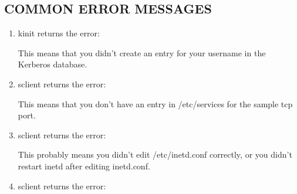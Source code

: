 \documentclass[letterpaper,10pt,english]{sphinxmanual}
\begin{document}
\subsection{COMMON ERROR MESSAGES}
\label{\detokenize{admin/admin_commands/sserver:common-error-messages}}\begin{enumerate}
%
\item {} 
\sphinxAtStartPar
kinit returns the error:

\begin{sphinxVerbatim}[commandchars=\\\{\}]
        
        
\end{sphinxVerbatim}

\sphinxAtStartPar
This means that you didn’t create an entry for your username in the
Kerberos database.

\item {} 
\sphinxAtStartPar
sclient returns the error:

\begin{sphinxVerbatim}[commandchars=\\\{\}]
    
\end{sphinxVerbatim}

\sphinxAtStartPar
This means that you don’t have an entry in /etc/services for the
sample tcp port.

\item {} 
\sphinxAtStartPar
sclient returns the error:

\begin{sphinxVerbatim}[commandchars=\\\{\}]
  
\end{sphinxVerbatim}

\sphinxAtStartPar
This probably means you didn’t edit /etc/inetd.conf correctly, or
you didn’t restart inetd after editing inetd.conf.

\item {} 
\sphinxAtStartPar
sclient returns the error:

\begin{sphinxVerbatim}[commandchars=\\\{\}]
        
\end{sphinxVerbatim}


\end{enumerate}
\end{document}
